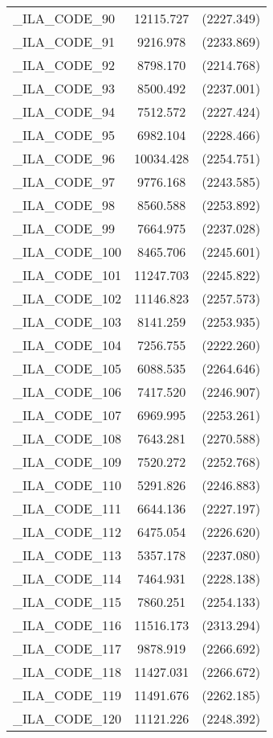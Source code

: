 {\begin{table}[htbp]
\begin{tabular}{l c c }
\_ILA\_CODE\_90  &  12115.727  & (2227.349)\\
\_ILA\_CODE\_91  &  9216.978  & (2233.869)\\
\_ILA\_CODE\_92  &  8798.170  & (2214.768)\\
\_ILA\_CODE\_93  &  8500.492  & (2237.001)\\
\_ILA\_CODE\_94  &  7512.572  & (2227.424)\\
\_ILA\_CODE\_95  &  6982.104  & (2228.466)\\
\_ILA\_CODE\_96  &  10034.428  & (2254.751)\\
\_ILA\_CODE\_97  &  9776.168  & (2243.585)\\
\_ILA\_CODE\_98  &  8560.588  & (2253.892)\\
\_ILA\_CODE\_99  &  7664.975  & (2237.028)\\
\_ILA\_CODE\_100  &  8465.706  & (2245.601)\\
\_ILA\_CODE\_101  &  11247.703  & (2245.822)\\
\_ILA\_CODE\_102  &  11146.823  & (2257.573)\\
\_ILA\_CODE\_103  &  8141.259  & (2253.935)\\
\_ILA\_CODE\_104  &  7256.755  & (2222.260)\\
\_ILA\_CODE\_105  &  6088.535  & (2264.646)\\
\_ILA\_CODE\_106  &  7417.520  & (2246.907)\\
\_ILA\_CODE\_107  &  6969.995  & (2253.261)\\
\_ILA\_CODE\_108  &  7643.281  & (2270.588)\\
\_ILA\_CODE\_109  &  7520.272  & (2252.768)\\
\_ILA\_CODE\_110  &  5291.826  & (2246.883)\\
\_ILA\_CODE\_111  &  6644.136  & (2227.197)\\
\_ILA\_CODE\_112  &  6475.054  & (2226.620)\\
\_ILA\_CODE\_113  &  5357.178  & (2237.080)\\
\_ILA\_CODE\_114  &  7464.931  & (2228.138)\\
\_ILA\_CODE\_115  &  7860.251  & (2254.133)\\
\_ILA\_CODE\_116  &  11516.173  & (2313.294)\\
\_ILA\_CODE\_117  &  9878.919  & (2266.692)\\
\_ILA\_CODE\_118  &  11427.031  & (2266.672)\\
\_ILA\_CODE\_119  &  11491.676  & (2262.185)\\
\_ILA\_CODE\_120  &  11121.226  & (2248.392)\\

\end{tabular}
\end{table}}
